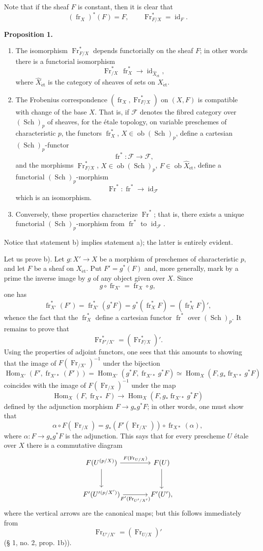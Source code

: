 \documentclass[11pt]{article}
\newenvironment{statement}[1]{\par\medskip\noindent\textbf{#1.}\ }{\par\medskip}
\DeclareMathOperator{\Hom}{Hom}
\providecommand{\et}{\mathrm{\acute{e}t}}
\providecommand{\id}{\operatorname{id}}
\providecommand{\Ob}{\operatorname{ob}}
\providecommand{\Hom}{\operatorname{Hom}}
\providecommand{\id}{\operatorname{id}}
\providecommand{\id}{\operatorname{id}}
\providecommand{\Ob}{\operatorname{ob}}
\providecommand{\id}{\operatorname{id}}
\providecommand{\id}{\operatorname{id}}
\providecommand{\Ob}{\operatorname{Ob}}
\providecommand{\Hom}{\operatorname{Hom}}
\providecommand{\Ob}{\operatorname{ob}}
\providecommand{\fr}{\operatorname{fr}}
\providecommand{\Fr}{\operatorname{Fr}}
\providecommand{\Sch}{\operatorname{Sch}}
\providecommand{\Fr}{\operatorname{Fr}}
\providecommand{\fr}{\operatorname{fr}}
\providecommand{\Sch}{\operatorname{Sch}}
\providecommand{\id}{\operatorname{id}}
\providecommand{\Ob}{\operatorname{Ob}}
\providecommand{\et}{\acute{e}t}
\begin{document}
Note that if the sheaf $F$ is constant, then it is clear that
\[
(\fr_X)^*(F)=F,
\qquad
\Fr^*_{F/X}=\id_F.
\]

\begin{statement}{Proposition 1}
\begin{enumerate}[label=\alph*)]
\item The isomorphism $\Fr^*_{F/X}$ depends functorially on the sheaf $F$; in other words there is a functorial isomorphism
\[
\Fr^*_{/X}\,\fr_X^*\longrightarrow \id_{\widehat X_{\et}},
\]
where $\widehat X_{\et}$ is the category of sheaves of sets on $X_{\et}$.
\item The Frobenius correspondence $(\fr_X,\Fr^*_{F/X})$ on $(X,F)$ is compatible with change of the base $X$. That is, if $\mathcal F$ denotes the fibred category over $(\Sch)_p$ of sheaves, for the étale topology, on variable preschemes of characteristic $p$, the functors $\fr_X^*$, $X\in\Ob(\Sch)_p$, define a cartesian $(\Sch)_p$-functor
\[
\fr^*: \mathcal F\longrightarrow\mathcal F,
\]
and the morphisms $\Fr^*_{F/X}$, $X\in\Ob(\Sch)_p$, $F\in\Ob\widehat X_{\et}$, define a functorial $(\Sch)_p$-morphism
\[
\Fr^*:\fr^*\longrightarrow\id_{\mathcal F}
\]
which is an isomorphism.
\item Conversely, these properties characterize $\Fr^*$; that is, there exists a unique functorial $(\Sch)_p$-morphism from $\fr^*$ to $\id_{\mathcal F}$.
\end{enumerate}
\end{statement}

Notice that statement b) implies statement a); the latter is entirely evident.

Let us prove b). Let $g:X'\to X$ be a morphism of preschemes of characteristic $p$, and let $F$ be a sheaf on $X_{\et}$. Put $F'=g^*(F)$ and, more generally, mark by a prime the inverse image by $g$ of any object given over $X$. Since
\[
g\circ\fr_{X'}=\fr_X\circ g,
\]
one has
\[
\fr_{X'}^*(F')=\fr_{X'}^*(g^*F)=g^*(\fr_X^*F)=(\fr_X^*F)',
\]
whence the fact that the $\fr_X^*$ define a cartesian functor $\fr^*$ over $(\Sch)_p$. It remains to prove that
\[
\Fr^*_{F'/X'}=(\Fr^*_{F/X})'.
\]
Using the properties of adjoint functors, one sees that this amounts to showing that the image of $F(\Fr_{/X'})^{-1}$ under the bijection
\[
\Hom_{X'}(F',\fr_{X'*}(F'))
 =\Hom_{X'}(g^*F,\fr_{X'*}g^*F)
 \simeq \Hom_X(F,g_*\fr_{X'*}g^*F)
\]
coincides with the image of $F(\Fr_{/X})^{-1}$ under the map
\[
\Hom_X(F,\fr_{X*}F)\longrightarrow
\Hom_X(F,g_*\fr_{X'*}g^*F)
\]
defined by the adjunction morphism $F\to g_*g^*F$; in other words, one must show that
\[
\alpha\circ F(\Fr_{/X})=g_*(F'(\Fr_{/X'}))\circ\fr_{X*}(\alpha),
\]
where $\alpha:F\to g_*g^*F$ is the adjunction. This says that for every prescheme $U$ étale over $X$ there is a commutative diagram
\[
\begin{tikzcd}[column sep=large,row sep=large]
F(U^{(p/X)}) \arrow[r,"F(\Fr_{U/X})"] \arrow[d]
& F(U) \arrow[d]\\
F'(U'{}^{(p/X')}) \arrow[r,"F'(\Fr_{U'/X'})"']
& F'(U') ,
\end{tikzcd}
\]
where the vertical arrows are the canonical maps; but this follows immediately from
\[
\Fr_{U'/X'}=(\Fr_{U/X})'
\]
(§ 1, no. 2, prop. 1b)).
\end{document}
